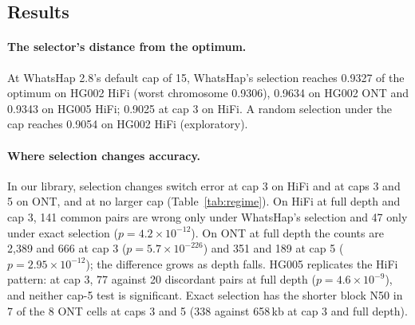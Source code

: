 \subsection{Results}\label{sec:selresults}

\paragraph{The selector's distance from the optimum.} At WhatsHap 2.8's
default cap of 15, WhatsHap's selection reaches 0.9327 of the optimum on
HG002 HiFi (worst chromosome 0.9306), 0.9634 on HG002 ONT and 0.9343 on
HG005 HiFi; 0.9025 at cap 3 on HiFi. A random selection under the cap reaches
0.9054 on HG002 HiFi (exploratory).

\paragraph{Where selection changes accuracy.} In our library, selection
changes switch error at cap 3 on HiFi and at caps 3 and 5 on ONT, and at no
larger cap (Table~\ref{tab:regime}). On HiFi at full depth and cap 3, 141
common pairs are wrong only under WhatsHap's selection and 47 only under
exact selection ($p=4.2\times10^{-12}$). On ONT at full depth the counts are
2{,}389 and 666 at cap 3 ($p=5.7\times10^{-226}$) and 351 and 189 at cap 5
($p=2.95\times10^{-12}$); the difference grows as depth falls. HG005
replicates the HiFi pattern: at cap 3, 77 against 20 discordant pairs at full
depth ($p=4.6\times10^{-9}$), and neither cap-5 test is significant. Exact
selection has the shorter block N50 in 7 of the 8 ONT cells at caps 3 and 5
(338 against 658\,kb at cap 3 and full depth).

